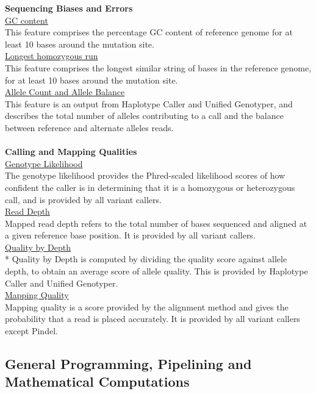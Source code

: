 \documentclass{article}
\begin{document}
\textbf{Sequencing Biases and Errors} \\[0.3\baselineskip]
\underline{GC content}\\
This feature comprises the percentage GC content of reference genome for at least 10 bases around the mutation site.\\[0.3\baselineskip]
\underline{Longest homozygous run}\\
This feature comprises the longest similar string of bases in the reference genome, for at least 10 bases around the mutation site.\\[0.3\baselineskip]
\underline{Allele Count and Allele Balance}\\
This feature is an output from Haplotype Caller and Unified Genotyper, and describes the total number of alleles contributing to a call and the balance between reference and alternate alleles reads.\\\\
\textbf{Calling and Mapping Qualities} \\[0.3\baselineskip]
\underline{Genotype Likelihood}\\
The genotype likelihood provides the Phred-scaled likelihood scores of how confident the caller is in determining that it is a homozygous or heterozygous call, and is provided by all variant callers.\\[0.3\baselineskip]
\underline{Read Depth}\\
Mapped read depth refers to the total number of bases sequenced and aligned at a given reference base position. It is provided by all variant callers.\\[0.3\baselineskip]
\underline{Quality by Depth}\\*
Quality by Depth is computed by dividing the quality score against allele depth, to obtain an average score of allele quality. This is provided by Haplotype Caller and Unified Genotyper.\\[0.3\baselineskip]
\underline{Mapping Quality}\\
Mapping quality is a score provided by the alignment method and gives the probability that a read is placed accurately. It is provided by all variant callers except Pindel.\\

\subsection{General Programming, Pipelining and Mathematical Computations}
\end{document}
